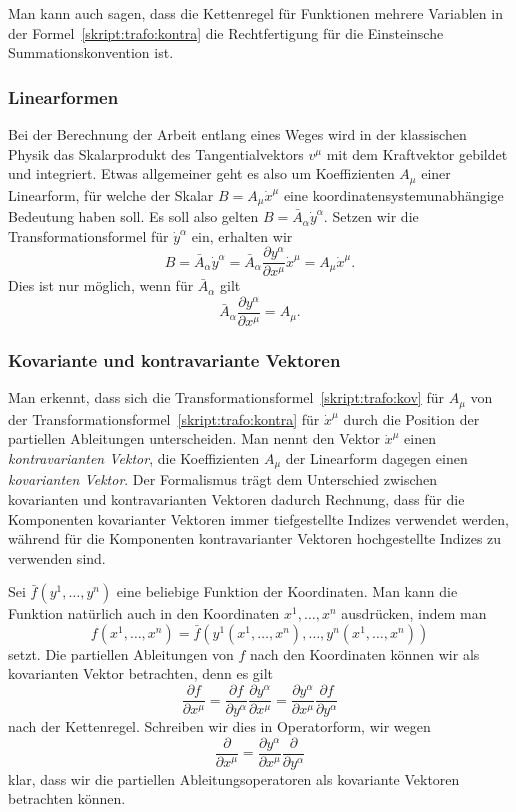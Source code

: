 Man kann auch sagen, dass die Kettenregel für Funktionen mehrere Variablen
in der Formel~\eqref{skript:trafo:kontra}
die Rechtfertigung für die Einsteinsche Summationskonvention ist.

\subsubsection{Linearformen}
Bei der Berechnung der Arbeit entlang eines Weges wird in der klassischen
Physik das Skalarprodukt des Tangentialvektors $v^\mu$ mit dem Kraftvektor
gebildet und integriert.
Etwas allgemeiner geht es also um Koeffizienten $A_\mu$ einer Linearform,
für welche der Skalar $B=A_\mu\dot x^\mu$ eine koordinatensystemunabhängige
Bedeutung haben soll.
Es soll also gelten
$B=\bar A_\alpha \dot y^\alpha$.
Setzen wir die Transformationsformel für $\dot y^\alpha$ ein, erhalten
wir
\begin{equation}
B=\bar A_\alpha\dot y^\alpha
=
\bar A_\alpha \frac{\partial y^\alpha}{\partial x^\mu}\dot x^\mu
=
A_\mu\dot x^\mu.
\end{equation}
Dies ist nur möglich, wenn für $\bar A_\alpha$ gilt
\begin{equation}
\bar A_\alpha \frac{\partial y^\alpha}{\partial x^\mu}
= 
A_\mu.
\label{skript:trafo:kov}
\end{equation}

\subsubsection{Kovariante und kontravariante Vektoren}
Man erkennt, dass sich die Transformationsformel~\eqref{skript:trafo:kov}
für $A_\mu$ von der Transformationsformel~\eqref{skript:trafo:kontra}
für $\dot x^\mu$ durch die Position der partiellen Ableitungen unterscheiden.
Man nennt den Vektor $\dot x^\mu$ einen {\em kontravarianten Vektor},
die Koeffizienten $A_\mu$ der Linearform dagegen einen {\em kovarianten Vektor}.
Der Formalismus trägt dem Unterschied zwischen kovarianten und kontravarianten
Vektoren dadurch Rechnung, dass für die Komponenten kovarianter Vektoren
immer tiefgestellte Indizes verwendet werden, während für die Komponenten
kontravarianter Vektoren hochgestellte Indizes zu verwenden sind.

Sei $\bar f(y^1,\dots,y^n)$ eine beliebige Funktion der Koordinaten.
Man kann die Funktion natürlich auch in den Koordinaten $x^1,\dots,x^n$
ausdrücken, indem man 
\[
f(x^1,\dots,x^n) = \bar f(y^1(x^1,\dots,x^n),\dots, y^n(x^1,\dots,x^n))
\]
setzt.
Die partiellen Ableitungen von $f$ nach den Koordinaten können wir
als kovarianten Vektor betrachten, denn es gilt
\[
\frac{\partial f}{\partial x^\mu}
=
\frac{\partial f}{\partial y^\alpha}\frac{\partial y^\alpha}{\partial x^\mu}
=
\frac{\partial y^\alpha}{\partial x^\mu}
\frac{\partial f}{\partial y^\alpha}
\]
nach der Kettenregel.
Schreiben wir dies in Operatorform, wir wegen
\[
\frac{\partial}{\partial x^\mu}
=
\frac{\partial y^\alpha}{\partial x^\mu}
\frac{\partial}{\partial y^\alpha}
\]
klar, dass wir die partiellen Ableitungsoperatoren als kovariante Vektoren
betrachten können.

